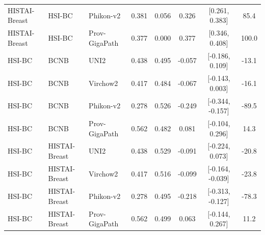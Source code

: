 \begin{table}[H]
{\begin{tabular}{l l l c c c c c}
HISTAI-Breast & HSI-BC & Phikon-v2 & 0.381 & 0.056 & 0.326 & [0.261, 0.383] & 85.4 \\
HISTAI-Breast & HSI-BC & Prov-GigaPath & 0.377 & 0.000 & 0.377 & [0.346, 0.408] & 100.0 \\
\midrule
HSI-BC & BCNB & UNI2 & 0.438 & 0.495 & -0.057 & [-0.186, 0.109] & -13.1 \\
HSI-BC & BCNB & Virchow2 & 0.417 & 0.484 & -0.067 & [-0.143, 0.003] & -16.1 \\
HSI-BC & BCNB & Phikon-v2 & 0.278 & 0.526 & -0.249 & [-0.344, -0.157] & -89.5 \\
HSI-BC & BCNB & Prov-GigaPath & 0.562 & 0.482 & 0.081 & [-0.104, 0.296] & 14.3 \\
\midrule
HSI-BC & HISTAI-Breast & UNI2 & 0.438 & 0.529 & -0.091 & [-0.224, 0.073] & -20.8 \\
HSI-BC & HISTAI-Breast & Virchow2 & 0.417 & 0.516 & -0.099 & [-0.164, -0.039] & -23.8 \\
HSI-BC & HISTAI-Breast & Phikon-v2 & 0.278 & 0.495 & -0.218 & [-0.313, -0.127] & -78.3 \\
HSI-BC & HISTAI-Breast & Prov-GigaPath & 0.562 & 0.499 & 0.063 & [-0.144, 0.267] & 11.2 \\
\midrule
\bottomrule
\end{tabular}
}
\end{table}

